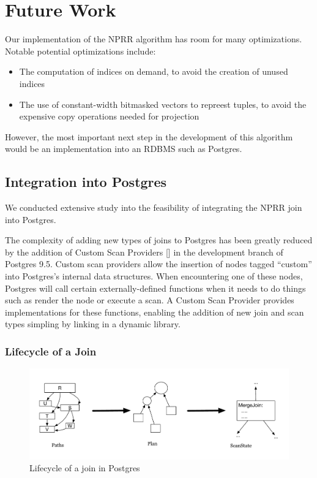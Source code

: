 \section{Future Work}

Our implementation of the NPRR algorithm has room for many
optimizations. Notable potential optimizations include:

\begin{itemize}
\item The computation of indices on demand, to avoid the creation of
  unused indices
\item The use of constant-width bitmasked vectors to repreest tuples,
  to avoid the expensive copy operations needed for projection
\end{itemize}

However, the most important next step in the development of this
algorithm would be an implementation into an RDBMS such as Postgres.

\subsection{Integration into Postgres}

We conducted extensive study into the feasibility of integrating the
NPRR join into Postgres. 

The complexity of adding new types of joins to Postgres has been
greatly reduced by the addition of Custom Scan Providers
[\cite{customscan}] in the development branch of Postgres 9.5. Custom
scan providers allow the insertion of nodes tagged ``custom'' into
Postgres's internal data structures. When encountering one of these
nodes, Postgres will call certain externally-defined functions when it
needs to do things such as render the node or execute a scan. A
Custom Scan Provider provides implementations for these functions,
enabling the addition of new join and scan types simpling by linking
in a dynamic library.

\subsubsection{Lifecycle of a Join}

\begin{figure}[h]
\label{fig:join_lifecycle}
\begin{center}
\includegraphics[scale=0.5]{join_lifecycle.pdf}
\end{center}
\caption{Lifecycle of a join in Postgres}
\end{figure}

